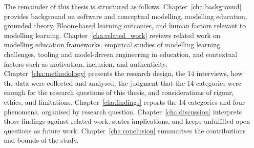 The remainder of this thesis is structured as follows. Chapter~\ref{cha:background} provides background on software and conceptual modelling, modelling education, grounded theory, Bloom-based learning outcomes, and human factors relevant to modelling learning. Chapter~\ref{cha:related_work} reviews related work on modelling education frameworks, empirical studies of modelling learning challenges, tooling and model-driven engineering in education, and contextual factors such as motivation, inclusion, and authenticity. Chapter~\ref{cha:methodology} presents the research design, the 14 interviews, how the data were collected and analysed, the judgment that the 14 categories were enough for the research questions of this thesis, and considerations of rigour, ethics, and limitations. Chapter~\ref{cha:findings} reports the 14 categories and four phenomena, organised by research question. Chapter~\ref{cha:discussion} interprets those findings against related work, states implications, and keeps unfulfilled open questions as future work. Chapter~\ref{cha:conclusion} summarises the contributions and bounds of the study.
